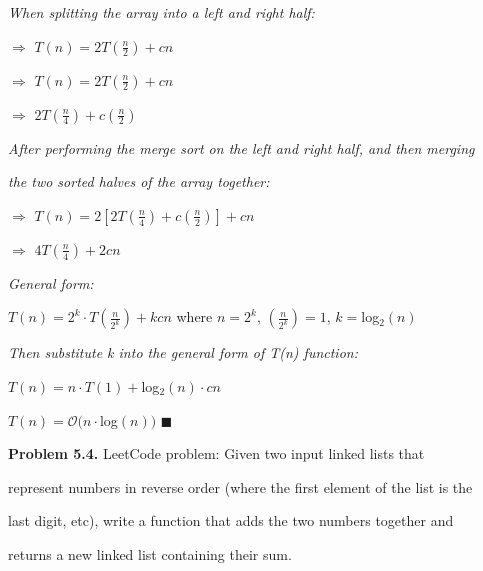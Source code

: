 \documentclass{article}
\begin{document}
\textit{When splitting the array into a left and right half:}

\vspace{0.1cm}

$\Rightarrow$ $T(n) = 2T(\frac{n}{2}) + cn$

$\Rightarrow$ $T(n) = 2T(\frac{n}{2}) + cn$

$\Rightarrow$ $2T(\frac{n}{4}) + c(\frac{n}{2})$

\vspace{0.2cm}
 
\textit{After performing the merge sort on the left and right half, and then merging}

\textit{the two sorted halves of the array together:}

\vspace{0.1cm}

$\Rightarrow$ $T(n) = 2 [2T(\frac{n}{4}) + c(\frac{n}{2})] + cn$

$\Rightarrow$ $4T(\frac{n}{4}) + 2cn$

\vspace{0.25cm}

\textit{General form:}

\vspace{0.1cm}

$T(n) = 2^k \cdot T(\frac{n}{2^k}) + kcn$ where $n=2^k$, $(\frac{n}{2^k}) = 1$, $k = $log$_2(n)$

\vspace{0.25cm}

\textit{Then substitute k into the general form of T(n) function:}

\vspace{0.1cm}

$T(n) = n \cdot T(1) + $log$_2(n) \cdot cn$

$T(n) = \mathcal{O}(n \cdot $log$(n))$ \hspace{1cm} $\blacksquare$

\vspace{0.5cm}

\textbf{Problem 5.4.} LeetCode problem: Given two input linked lists that 

represent numbers in reverse order (where the first element of the list is the 

last digit, etc), write a function that adds the two numbers together and 

returns a new linked list containing their sum.
\end{document}
